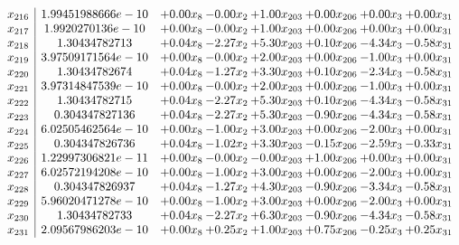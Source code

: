 \documentclass[8pt]{article}
\begin{document}
\[\begin{array}{c| c c@{\hskip 2pt} c@{\hskip 2pt} c@{\hskip 2pt} c@{\hskip 2pt} c@{\hskip 2pt} c@{\hskip 2pt} }
 x_{216}   &  1.99451988666e-10 & +  0.00 x_{8} & -0.00 x_{2} & +  1.00 x_{203} & +  0.00 x_{206} & +  0.00 x_{3} & +  0.00 x_{31}\\
 x_{217}   &  1.9920270136e-10 & +  0.00 x_{8} & -0.00 x_{2} & +  1.00 x_{203} & +  0.00 x_{206} & +  0.00 x_{3} & +  0.00 x_{31}\\
 x_{218}   &  1.30434782713 & +  0.04 x_{8} & -2.27 x_{2} & +  5.30 x_{203} & +  0.10 x_{206} & -4.34 x_{3} & -0.58 x_{31}\\
 x_{219}   &  3.97509171564e-10 & +  0.00 x_{8} & -0.00 x_{2} & +  2.00 x_{203} & +  0.00 x_{206} & -1.00 x_{3} & +  0.00 x_{31}\\
 x_{220}   &  1.30434782674 & +  0.04 x_{8} & -1.27 x_{2} & +  3.30 x_{203} & +  0.10 x_{206} & -2.34 x_{3} & -0.58 x_{31}\\
 x_{221}   &  3.97314847539e-10 & +  0.00 x_{8} & -0.00 x_{2} & +  2.00 x_{203} & +  0.00 x_{206} & -1.00 x_{3} & +  0.00 x_{31}\\
 x_{222}   &  1.30434782715 & +  0.04 x_{8} & -2.27 x_{2} & +  5.30 x_{203} & +  0.10 x_{206} & -4.34 x_{3} & -0.58 x_{31}\\
 x_{223}   &  0.304347827136 & +  0.04 x_{8} & -2.27 x_{2} & +  5.30 x_{203} & -0.90 x_{206} & -4.34 x_{3} & -0.58 x_{31}\\
 x_{224}   &  6.02505462564e-10 & +  0.00 x_{8} & -1.00 x_{2} & +  3.00 x_{203} & +  0.00 x_{206} & -2.00 x_{3} & +  0.00 x_{31}\\
 x_{225}   &  0.304347826736 & +  0.04 x_{8} & -1.02 x_{2} & +  3.30 x_{203} & -0.15 x_{206} & -2.59 x_{3} & -0.33 x_{31}\\
 x_{226}   &  1.22997306821e-11 & +  0.00 x_{8} & -0.00 x_{2} & -0.00 x_{203} & +  1.00 x_{206} & +  0.00 x_{3} & +  0.00 x_{31}\\
 x_{227}   &  6.02572194208e-10 & +  0.00 x_{8} & -1.00 x_{2} & +  3.00 x_{203} & +  0.00 x_{206} & -2.00 x_{3} & +  0.00 x_{31}\\
 x_{228}   &  0.304347826937 & +  0.04 x_{8} & -1.27 x_{2} & +  4.30 x_{203} & -0.90 x_{206} & -3.34 x_{3} & -0.58 x_{31}\\
 x_{229}   &  5.96020471278e-10 & +  0.00 x_{8} & -1.00 x_{2} & +  3.00 x_{203} & +  0.00 x_{206} & -2.00 x_{3} & +  0.00 x_{31}\\
 x_{230}   &  1.30434782733 & +  0.04 x_{8} & -2.27 x_{2} & +  6.30 x_{203} & -0.90 x_{206} & -4.34 x_{3} & -0.58 x_{31}\\
 x_{231}   &  2.09567986203e-10 & +  0.00 x_{8} & +  0.25 x_{2} & +  1.00 x_{203} & +  0.75 x_{206} & -0.25 x_{3} & +  0.25 x_{31}\\

\end{array}\]
\end{document}
